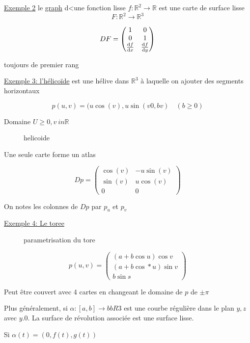\underline{Exemple 2} le \underline{graph}  d<une fonction lisse $f: \mathbb{R}^{2} \to \mathbb{R}$ est une carte de surface lisse  
$$F: \mathbb{R}^{2} \to \mathbb{R}^{3} $$ 

$$DF = \begin{pmatrix}
	1 &0\\ 0 & 1 \\ \dv{f}{x} & \dv{f}{y}
\end{pmatrix}$$ 

toujours de premier rang

\underline{Exemple 3: l'hélicoïde} est une hélive dans $\mathbb{R}^{3} $ à laquelle on ajouter des segments horizontaux 

$$p(u,v) = (u\cos(v),u\sin(v0, bv) \quad (b \ge 0)$$ 

Domaine $U \ge 0, v\ in \mathbb{R}$ 

\begin{figure}[h!]
    \centering
    \caption{helicoide}
    \label{fig:helicoide}
\end{figure}

Une seule carte forme un atlas

$$Dp = \begin{pmatrix}
	\cos(v) & - u\sin(v)\\ \sin(v) & u\cos(v) \\ 0 & 0
\end{pmatrix}$$ 

On notes les colonnes de $Dp$ par $p_u$ et $p_v$


\underline{Exemple 4: Le toree} 

\begin{figure}[ht]
    \centering
    \caption{parametrisation du tore}
    \label{fig:parametrisation-du-tore}
\end{figure}


$$p(u,v) = \begin{pmatrix} 
	(a+b\cos u) \cos v \\ (a + b\cos*u)\sin v\\ b \sin s
\end{pmatrix}$$ 

Peut être couvert avec 4 cartes en changeant le domaine de $p$ de $\pm \pi$

Plus généralement, si $\alpha: [a,b] \to bb R 3$ est une courbe régulière dans le plan $y,z$ avec $y.0$. La surface de révolution associée est une surface lisse.

Si $\alpha(t) = (0, f(t), g(t))$

